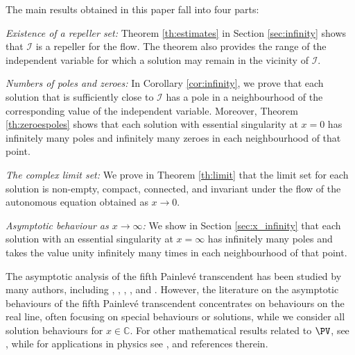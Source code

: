 The main results obtained in this paper fall into four parts:
\vspace{2pt}
\begin{list}{}
  {
    \setlength{\parsep}{2pt}
    \setlength{\leftmargin}{12pt}\setlength{\rightmargin}{12pt}
    \setlength{\itemindent=-12pt}
  }

\item {\em Existence of a repeller set:} Theorem \ref{th:estimates} in Section \ref{sec:infinity} shows that $\mathcal I$ is a repeller for the flow. The theorem also provides the range of the independent variable for which a solution may remain in the vicinity of $\mathcal{I}$.
\item {\em Numbers of poles and zeroes:} In Corollary \ref{cor:infinity}, we prove that each solution that is sufficiently close to $\mathcal{I}$ has a pole in a neighbourhood of the corresponding value of the independent variable. Moreover, Theorem \ref{th:zeroespoles} shows that each solution with essential singularity at $x=0$ has infinitely many poles and infinitely many zeroes in each neighbourhood of that point.
\item {\em The complex limit set:} We prove in Theorem \ref{th:limit} that the limit set for each solution is non-empty, compact, connected, and invariant under the flow of the autonomous equation obtained as $x\to0$.
\item {\em Asymptotic behaviour as $x\to\infty$:} We show in Section \ref{sec:x_infinity} that each solution with an essential singularity at $x=\infty$ has infinitely many poles and takes the value unity infinitely many times in each neighbourhood of that point.
\end{list}
\vspace{2pt}

The asymptotic analysis of the fifth Painlev\'e transcendent has been studied by many authors, including
\citeauthor{AK2000} , , \citeauthor{LM1999} , \citeauthor{McCoyTang1986} , and .
However, the literature on the asymptotic behaviours of the fifth Painlev\'e transcendent concentrates on behaviours on the real line, often focusing on special behaviours or solutions, while we consider all solution behaviours for $x\in\mathbb C$.
For other mathematical results related to $\PV$, see \cites{BFSVZ2013,Shimomura2011,KO2007,Sasaki2007,Clark2005b,LS2004,GJP2001,GJP2001b},
while for applications in physics see \cites{JMMS1980,Dyson1995,  Schief1994}, and references therein.

